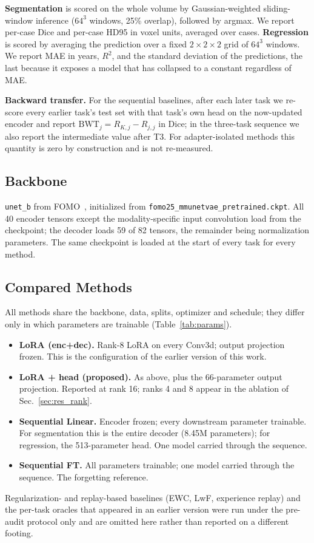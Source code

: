 \documentclass[journal,twoside,web]{ieeecolor}
\begin{document}
\textbf{Segmentation} is scored on the whole volume by Gaussian-weighted sliding-window inference ($64^3$ windows, 25\% overlap), followed by argmax. We report per-case Dice and per-case HD95 in voxel units, averaged over cases. \textbf{Regression} is scored by averaging the prediction over a fixed $2{\times}2{\times}2$ grid of $64^3$ windows. We report MAE in years, $R^2$, and the standard deviation of the predictions, the last because it exposes a model that has collapsed to a constant regardless of MAE.

\textbf{Backward transfer.} For the sequential baselines, after each later task we re-score every earlier task's test set with that task's own head on the now-updated encoder and report $\text{BWT}_j = R_{K,j} - R_{j,j}$ in Dice; in the three-task sequence we also report the intermediate value after T3. For adapter-isolated methods this quantity is zero by construction and is not re-measured.

\subsection{Backbone}
\label{sec:backbone}

\texttt{unet\_b} from FOMO~\cite{fomo2025}, initialized from \texttt{fomo25\_mmunetvae\_pretrained.ckpt}. All 40 encoder tensors except the modality-specific input convolution load from the checkpoint; the decoder loads 59 of 82 tensors, the remainder being normalization parameters. The same checkpoint is loaded at the start of every task for every method.

\subsection{Compared Methods}
\label{sec:baselines}

All methods share the backbone, data, splits, optimizer and schedule; they differ only in which parameters are trainable (Table~\ref{tab:params}).
\begin{itemize}
\item \textbf{LoRA (enc+dec).} Rank-8 LoRA on every Conv3d; output projection frozen. This is the configuration of the earlier version of this work.
\item \textbf{LoRA + head (proposed).} As above, plus the 66-parameter output projection. Reported at rank 16; ranks 4 and 8 appear in the ablation of Sec.~\ref{sec:res_rank}.
\item \textbf{Sequential Linear.} Encoder frozen; every downstream parameter trainable. For segmentation this is the entire decoder (8.45M parameters); for regression, the 513-parameter head. One model carried through the sequence.
\item \textbf{Sequential FT.} All parameters trainable; one model carried through the sequence. The forgetting reference.
\end{itemize}
Regularization- and replay-based baselines (EWC, LwF, experience replay) and the per-task oracles that appeared in an earlier version were run under the pre-audit protocol only and are omitted here rather than reported on a different footing.
\end{document}
